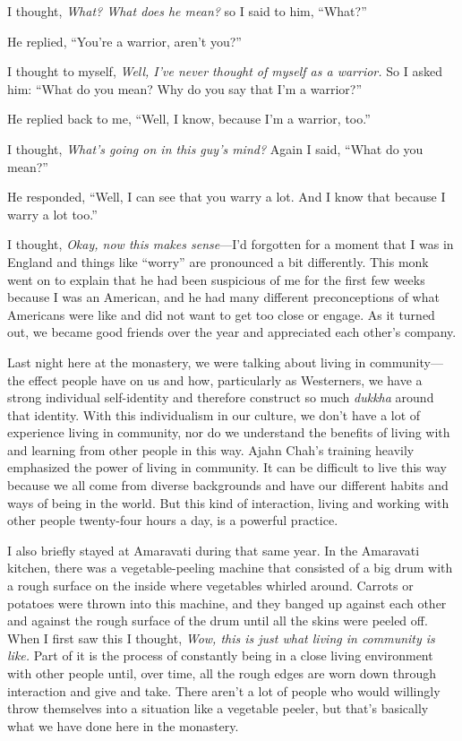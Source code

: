 I thought, \emph{What? What does he mean?} so I said to him, ``What?''

He replied, ``You're a warrior, aren't you?''

I thought to myself, \emph{Well, I've never thought of myself as a 
warrior.} So I asked him: ``What do you mean? Why do you say that I'm a 
warrior?''

He replied back to me, ``Well, I know, because I'm a warrior, too.''

I thought, \emph{What's going on in this guy's mind?} Again I said, 
``What do you mean?''

He responded, ``Well, I can see that you warry a lot. And I know that 
because I warry a lot too.''

I thought, \emph{Okay, now this makes sense}---I'd forgotten for a 
moment that I was in England and things like ``worry'' are pronounced a 
bit differently. This monk went on to explain that he had been 
suspicious of me for the first few weeks because I was an American, and 
he had many different preconceptions of what Americans were like and 
did not want to get too close or engage. As it turned out, we became 
good friends over the year and appreciated each other's company.

Last night here at the monastery, we were talking about living in 
community---the effect people have on us and how, particularly as 
Westerners, we have a strong individual self-identity and therefore 
construct so much \emph{dukkha} around that identity. With this 
individualism in our culture, we don't have a lot of experience living 
in community, nor do we understand the benefits of living with and 
learning from other people in this way. Ajahn Chah's training heavily 
emphasized the power of living in community. It can be difficult to 
live this way because we all come from diverse backgrounds and have our 
different habits and ways of being in the world. But this kind of 
interaction, living and working with other people twenty-four hours a 
day, is a powerful practice.

I also briefly stayed at Amaravati during that same year. In the 
Amaravati kitchen, there was a vegetable-peeling machine that consisted 
of a big drum with a rough surface on the inside where vegetables 
whirled around. Carrots or potatoes were thrown into this machine, and 
they banged up against each other and against the rough surface of the 
drum until all the skins were peeled off. When I first saw this I 
thought, \emph{Wow, this is just what living in community is like.} 
Part of it is the process of constantly being in a close living 
environment with other people until, over time, all the rough edges are 
worn down through interaction and give and take. There aren't a lot of 
people who would willingly throw themselves into a situation like a 
vegetable peeler, but that's basically what we have done here in the 
monastery.

